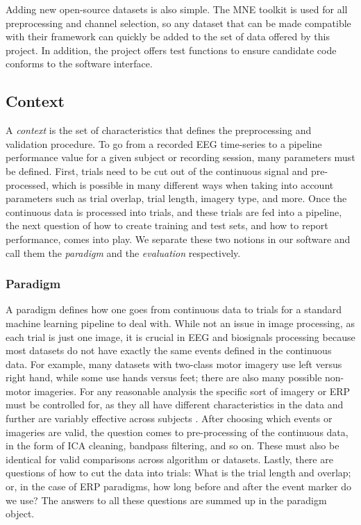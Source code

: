 Adding new open-source datasets is also simple. The MNE toolkit
\cite{Gramfort2014,Gramfort2013} is used for all preprocessing and channel
selection, so any dataset that can be made compatible with their framework can
quickly be added to the set of data offered by this project. In addition, the
project offers test functions to ensure candidate code conforms to the software
interface.

\subsection{Context}

A \emph{context} is the set of characteristics that defines the
preprocessing and validation procedure. To go from a recorded EEG
time-series to a pipeline performance value for a given subject or
recording session, many parameters must be defined. First, trials need to be
cut out of the continuous signal and pre-processed, which is
possible in many different ways when taking into account parameters such as
trial overlap, trial length, imagery type, and more. Once the
continuous data is processed into trials, and these trials are fed
into a pipeline, the next question of how to create training and test sets,
and how to report performance, comes into play. We separate these two
notions in our software and call them the \emph{paradigm} and the
\emph{evaluation} respectively.

\subsubsection{Paradigm}

A paradigm defines how one goes from continuous data to trials for a standard
machine learning pipeline to deal with. While not an issue in image processing,
as each trial is just one image, it is crucial in EEG and biosignals processing
because most datasets do not have exactly the same events defined in the
continuous data. For example, many datasets with two-class motor imagery use
left versus right hand, while some use hands versus feet; there are also many
possible non-motor imageries. For any reasonable analysis the specific sort of
imagery or ERP must be controlled for, as they all have different
characteristics in the data and further are variably effective across subjects
\cite{Scherer2015a,Allison2010}. After choosing which events or imageries are
valid, the question comes to pre-processing of the continuous data, in the form
of ICA cleaning, bandpass filtering, and so on. These must also be identical for
valid comparisons across algorithm or datasets. Lastly, there are questions of
how to cut the data into trials: What is the trial length and overlap; or, in
the case of ERP paradigms, how long before and after the event marker do we use?
The answers to all these questions are summed up in the paradigm object.

